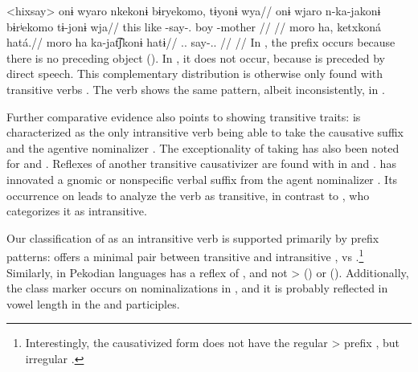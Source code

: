 \pex<hixsay>\hixka
{}
\begingl
\glpreamble onɨ wyaro nkekonɨ bɨryekomo, tɨyonɨ wya//
\gla onɨ wjaro n-ka-jakonɨ bɨrʲekomo tɨ-jonɨ wja//
\glb this like -say-. boy -mother //
\glft {} \parencite[][36]{hixkaryanaderby1985}//
\endgl
{}
\begingl
\glpreamble moro ha, ketxkoná hatá.//
\gla moro ha ka-jat͡ʃkonɨ hatɨ//
\glb {}..  say-.. //
\glft {} \parencite[][14]{derbyshire1965textos}//
\endgl
\xe
In , the prefix  occurs because there is no preceding object ().
In , it does not occur, because  is preceded by direct speech.
This complementary distribution is otherwise only found with transitive verbs \parencite[59--60]{gildea1998}.
The verb shows the same pattern, albeit inconsistently, in \trio \parencite[267]{triocarlin2004}.

Further comparative evidence also points to   showing transitive traits:
\trio {} is characterized as the only intransitive verb being able to take the causative suffix  and the agentive nominalizer  \parencite[263, 169]{triomeira1999}.
The exceptionality of   taking   has also been noted for \kalina \parencite[82]{courtz2008carib} and \wayana \parencite[258]{wayanatavares2005}.
Reflexes of another transitive causativizer  \parencite{gildea2015valency} are found with  in \apalai \parencite[51]{koehn1986apalai} and \waiwai \parencite[52]{waiwaihawkins1998}.
\panare has innovated a gnomic or nonspecific verbal suffix  from the agent nominalizer  \parencite[184]{gildea1998}.
Its occurrence on  leads \parencite[214]{panarepayne2013} to analyze the verb as transitive, in contrast to \textcite[102]{mattei1994diccionario}, who categorizes it as intransitive.

Our classification of  as an intransitive verb is supported primarily by prefix patterns:
\kalina offers a minimal pair between transitive   and intransitive  ,   vs   \parencite[288, 45]{courtz2008carib}.\footnote{Interestingly, the \kalina causativized form   does not have the regular > prefix , but irregular  \parencite[430]{courtz2008carib}.}
Similarly,  in Pekodian languages has a reflex of   , and not >  (\bakairi) or  (\PXin).
Additionally, the  class marker  occurs on nominalizations in \kalina {}, and it is probably reflected in vowel length in the \trio \parencite[333]{triomeira1999} and \wayana \parencite[196]{wayanatavares2005} participles.

